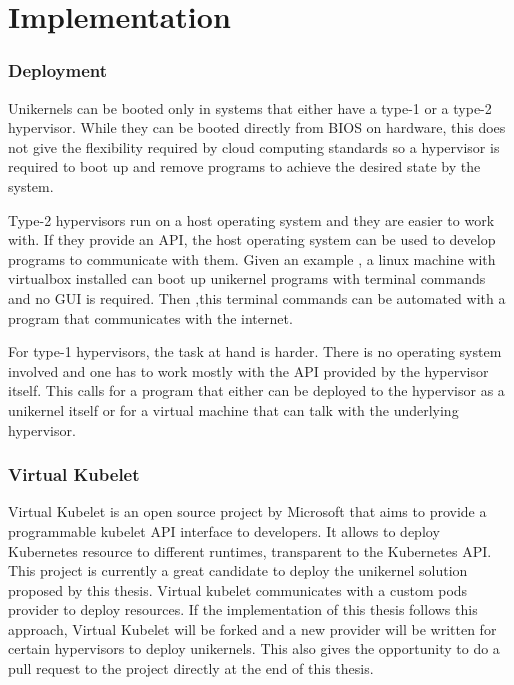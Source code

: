 \chapter{Implementation}\label{chapter:implementation}

\subsection{Deployment}
Unikernels can be booted only in systems that either have a type-1 or a type-2 hypervisor. While they can be booted directly from BIOS on hardware, this does not give the flexibility required by cloud computing standards so a hypervisor is required to boot up and remove programs to achieve the desired state by the system.

Type-2 hypervisors run on a host operating system and they are easier to work with. If they provide an API, the host operating system can be used to develop programs to communicate with them. Given an example , a linux machine with virtualbox installed can boot up unikernel programs with terminal commands and no GUI is required. Then ,this terminal commands can be automated with a program that communicates with the internet.

For type-1 hypervisors, the task at hand is harder. There is no operating system involved and one has to work mostly with the API provided by the hypervisor itself. This calls for a program that either can be deployed to the hypervisor as a unikernel itself or for a virtual machine that can talk with the underlying hypervisor.




\subsection{Virtual Kubelet}
Virtual Kubelet\cite{virtual} is an open source project by Microsoft that aims to provide a programmable kubelet API interface to developers. It allows to deploy Kubernetes resource to different runtimes, transparent to the Kubernetes API. This project is currently a great candidate to deploy the unikernel solution proposed by this thesis. Virtual kubelet communicates with a custom pods provider to deploy resources. If the implementation of this thesis follows this approach, Virtual Kubelet will be forked and a new provider will be written for certain hypervisors to deploy unikernels. This also gives the opportunity to do a pull request to the project directly at the end of this thesis.


